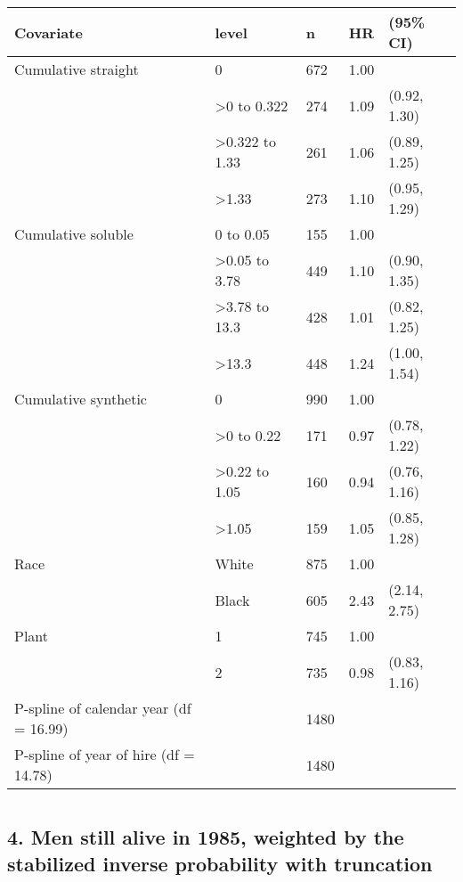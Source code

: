 \documentclass[10pt,]{article}
\begin{document}
\begin{table}[H]
\centering
\begin{tabular}{lllll}
  \toprule
Covariate & level & n & HR & (95\% CI) \\ 
  \midrule
Cumulative straight & 0 & 672 & 1.00 &  \\ 
   & >0 to 0.322 & 274 & 1.09 & (0.92, 1.30) \\ 
   & >0.322 to 1.33 & 261 & 1.06 & (0.89, 1.25) \\ 
   & >1.33 & 273 & 1.10 & (0.95, 1.29) \\ 
  Cumulative soluble & 0 to 0.05 & 155 & 1.00 &  \\ 
   & >0.05 to 3.78 & 449 & 1.10 & (0.90, 1.35) \\ 
   & >3.78 to 13.3 & 428 & 1.01 & (0.82, 1.25) \\ 
   & >13.3 & 448 & 1.24 & (1.00, 1.54) \\ 
  Cumulative synthetic & 0 & 990 & 1.00 &  \\ 
   & >0 to 0.22 & 171 & 0.97 & (0.78, 1.22) \\ 
   & >0.22 to 1.05 & 160 & 0.94 & (0.76, 1.16) \\ 
   & >1.05 & 159 & 1.05 & (0.85, 1.28) \\ 
  Race & White & 875 & 1.00 &  \\ 
   & Black & 605 & 2.43 & (2.14, 2.75) \\ 
  Plant & 1 & 745 & 1.00 &  \\ 
   & 2 & 735 & 0.98 & (0.83, 1.16) \\ 
  P-spline of calendar year (df = 16.99) &  & 1480 &  &  \\ 
  P-spline of year of hire (df = 14.78) &  & 1480 &  &  \\ 
   \bottomrule
\end{tabular}
\end{table}

\hypertarget{section-6}{%
\section{}\label{section-6}}

\hypertarget{men-still-alive-in-1985-weighted-by-the-stabilized-inverse-probability-with-truncation}{%
\subsection{4. Men still alive in 1985, weighted by the stabilized
inverse probability with
truncation}\label{men-still-alive-in-1985-weighted-by-the-stabilized-inverse-probability-with-truncation}}
\end{document}
